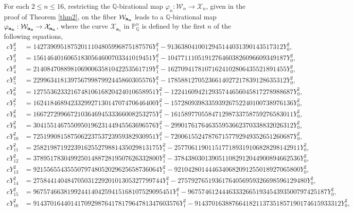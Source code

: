 \documentclass[11pt, a4paper]{amsart}
\theoremstyle{definition}
\newcommand{\Q}{\mathbb{Q}}
\newcommand{\Pp}{\mathbb{P}}
\newcommand{\Wc}{\mathcal{W}}
\newcommand{\Xc}{\mathcal{X}}
\newcommand{\ba}{\mathbf{a}}
\begin{document}
For  each $2 \leq n\leq 16$,  restricting the $\Q$-birational map
$\varphi_n: 	\Wc_n  \rightarrow \Xc_n $, given in the proof of Theorem \ref{thm2},  on the fiber $\Wc_{\bf a_n}$ leads to a $\Q$-birational map 
$\varphi_{\bf a_n}: 	\Wc_{\bf a_n}  \rightarrow \Xc_{\bf a_n}$, where the curve $\Xc_{\ba_n}$ in
$\Pp_\Q^{n}$  is defined  by  the first $n$ of the following equations,
%
%
{\scriptsize
	\begin{align*}  
		c Y_2^2  & = 14273909518752011104805996875187576 Y_1^2 - 9136380410012945144031390143517312 Y_0^2,  \\
		c Y_3^2  & = 15614640160651830564600703341019451 Y_1^2 -10477111051912764603826096609349187 Y_0^2, \\
		c Y_4^2  & = 21408470889810690063581042253561719 Y_1^2 -16270941781071624102806435521891455 Y_0^2, \\
		c Y_5^2  & = 22996341813975679987992445860305576 Y_1^2 -17858812705236614027217839128635312 Y_0^2,\\
		c Y_6^2  & = 127553623321674810616820424010658951 Y_1^2 -122416094212935744656045817278988687 Y_0^2,\\
		c Y_7^2  & = 162418468942332992713014707470646400 Y_1^2 -157280939833593926752240100738976136 Y_0^2,\\
		c Y_8^2  & = 166727299667210364694533366008253275 Y_1^2 -161589770558471298733758759276583011 Y_0^2, \\
		c Y_9^2  & = 304155146755095019623144945563696576 Y_1^2 -299017617646355953662370338832026312 Y_0^2, \\
		c Y_{10}^2 & = 725199081587506223753723959382930951 Y_1^2 -720061552478767157792949352651260687 Y_0^2,\\
		c Y_{11}^2 & = 2582198719223916255279881435029813175 Y_1^2  -2577061190115177189319106828298142911 Y_0^2 , \\
		c Y_{12}^2 & = 3789517830499250148872819507626332800 Y_1^2 -3784380301390511082912044900894662536 Y_0^2,  \\
		c Y_{13}^2 & = 9215565543555079748052029625658736064 Y_1^2 -9210428014446340682091255018927065800 Y_0^2,\\
		c Y_{14}^2 & = 27584414048470503122920101305327799744 Y_1^2  -27579276519361764056959326698596129480 Y_0^2,\\
		c Y_{15}^2 & = 96757466381992441404259415168107529095451 Y_1^2 -96757461244463332665193454393500797425187 Y_0^2,\\
		c Y_{16}^2 & = 9143701644014170929876417817964781347603576 Y_1^2 -9143701638876641821137351857190174615933312 Y_0^2,
\end{align*}}
\end{document}
